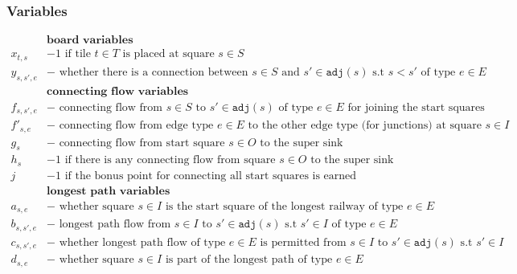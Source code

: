 \documentclass[11pt,a4paper]{article}
\begin{document}
\subsubsection*{Variables}
\begin{align*}
& \textbf{board variables} \\
x_{t,s} &- 1 \textrm{ if tile } t \in T \textrm{ is placed at square } s \in S \\
y_{s,s',e} &- \textrm{ whether there is a connection between } s \in S \textrm{ and } 
s' \in \texttt{adj}(s) \textrm{ s.t } s < s' \textrm{ of type } e \in E \\
& \textbf{connecting flow variables} \\
f_{s,s',e} &- \textrm{ connecting flow from } s \in S \textrm{ to } s' \in \texttt{adj}(s) \textrm{ of type } e \in E \textrm{ for joining the start squares} \\
f'_{s,e} &- \textrm{ connecting flow from edge type } e \in E \textrm{ to the other edge type (for junctions) at square } s \in I \\
g_{s} &- \textrm{ connecting flow from start square } s \in O \textrm{ to the super sink} \\
h_{s} &- 1 \textrm{ if there is any connecting flow from square } s \in O \textrm{ to the super sink} \\
j &- 1 \textrm{ if the bonus point for connecting all start squares is earned} \\
& \textbf{longest path variables} \\
a_{s,e} &- \textrm{ whether square } s \in I \textrm{ is the start square of the longest railway of type } e \in E \\
b_{s,s',e} &- \textrm{ longest path flow from } s \in I \textrm{ to } s' \in \texttt{adj}(s) \textrm{ s.t } s' \in I \textrm{ of type } e \in E \\
c_{s,s',e} &- \textrm{ whether longest path flow of type } e \in E \textrm{ is permitted from } s \in I \textrm{ to } s' \in \texttt{adj}(s) \textrm{ s.t } s' \in I \\
d_{s,e} &- \textrm{ whether square } s \in I \textrm{ is part of the longest path of type } e \in E
\end{align*}
\end{document}

